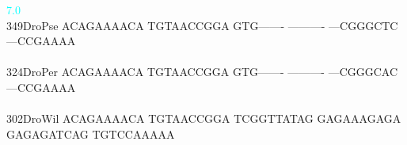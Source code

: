 \documentclass[11pt,twoside,reqno,a4paper]{article}
\begin{document}
{\hspace*{4\charwidth}\hspace*{7\charwidth}\hspace*{1\charwidth}\hspace*{16\charwidth}\textcolor{cyan}{7.0}\hspace*{1\charwidth}\hspace*{1\charwidth}\hspace*{1\charwidth}\hspace*{1\charwidth}\hspace*{1\charwidth}\\
349\hspace*{1\charwidth}DroPse	ACAGAAAACA	TGTAACCGGA	GTG-------	----------	---CGGGCTC	---CCGAAAA	\\
\hspace*{4\charwidth}\hspace*{7\charwidth}\hspace*{1\charwidth}\hspace*{1\charwidth}\hspace*{1\charwidth}\hspace*{1\charwidth}\hspace*{1\charwidth}\hspace*{1\charwidth}\\
324\hspace*{1\charwidth}DroPer	ACAGAAAACA	TGTAACCGGA	GTG-------	----------	---CGGGCAC	---CCGAAAA	\\
\hspace*{4\charwidth}\hspace*{7\charwidth}\hspace*{1\charwidth}\hspace*{1\charwidth}\hspace*{1\charwidth}\hspace*{1\charwidth}\hspace*{1\charwidth}\hspace*{1\charwidth}\\
302\hspace*{1\charwidth}DroWil	ACAGAAAACA	TGTAACCGGA	TCGGTTATAG	GAGAAAGAGA	GAGAGATCAG	TGTCCAAAAA	\\
\hspace*{4\charwidth}\hspace*{7\charwidth}\hspace*{1\charwidth}\hspace*{1\charwidth}\hspace*{1\charwidth}\hspace*{1\charwidth}\hspace*{1\charwidth}\hspace*{1\charwidth}\\
}
\end{document}
